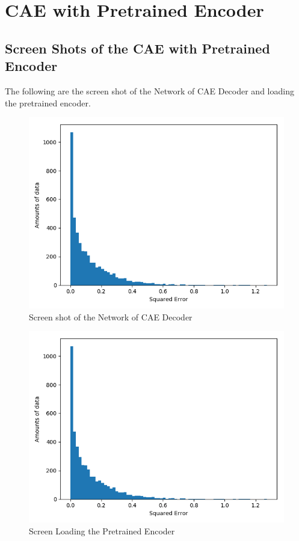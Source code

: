 \documentclass{article}
\begin{document}
\section{CAE with Pretrained Encoder}

\subsection{Screen Shots of the CAE with Pretrained Encoder}
The following are the screen shot of the Network of CAE Decoder and loading the pretrained encoder.

\begin{figure}[h]
  \centering
  \includegraphics[scale=0.3]{fifa_lg.png}
  \caption{Screen shot of the Network of CAE Decoder}
\end{figure}

\begin{figure}[h]
  \centering
  \includegraphics[scale=0.3]{fifa_lg.png}
  \caption{Screen Loading the Pretrained Encoder}
\end{figure}
\end{document}
